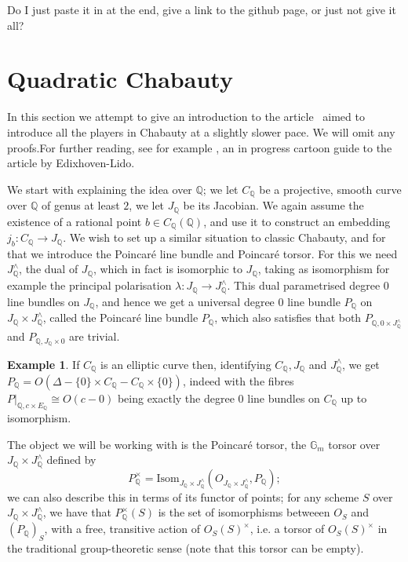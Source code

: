 \documentclass[12pt]{article}
\renewcommand{\G}{\mathbb{G}}
\newcommand{\Q}{\mathbb{Q}}
\theoremstyle{plain}
\theoremstyle{definition}
\newtheorem{exmp}[thm]{Example} %
\theoremstyle{remark}
\begin{document}
 Do I just paste it in at the end, give a link to the github page, or just not give it all?

\section{Quadratic Chabauty}
\label{section:quadratic}
In this section we attempt to give an introduction to the article~\citep{edixhoven20} aimed to introduce all the players in Chabauty at a slightly slower pace. We will omit any proofs.For further reading, see for example \citep{hashimoto20}, an in progress cartoon guide to the article by Edixhoven-Lido.

We start with explaining the idea over $\Q$; we let $C_\Q$ be a projective, smooth curve over $\Q$ of genus at least $2$, we let $J_\Q$ be its Jacobian. We again assume the existence of a rational point $b \in C_\Q(\Q)$, and use it to construct an embedding $j_b : C_\Q \to J_\Q$. We wish to set up a similar situation to classic Chabauty, and for that we introduce the Poincar\'e line bundle and Poincar\'e torsor. For this we need $J_\Q^\wedge$, the dual of $J_\Q$, which in fact is isomorphic to $J_\Q$, taking as isomorphism for example the principal polarisation $\lambda: J_\Q \to J_\Q^\wedge$. This dual parametrised degree $0$ line bundles on $J_\Q$, and hence we get a universal degree $0$ line bundle $P_\Q$ on $J_\Q \times J_\Q^\wedge$, called the Poincar\'e line bundle $P_\Q$, which also satisfies that both $P_{\Q,0\times J_\Q^\wedge}$ and $P_{\Q,J_\Q \times 0}$ are trivial.

\begin{exmp}
If $C_\Q$ is an elliptic curve then, identifying $C_\Q,J_\Q$ and $J_\Q^{\wedge}$, we get $P_\Q = O(\Delta-\{0\} \times C_\Q - C_\Q \times \{0\})$, indeed with the fibres $P|_{\Q,c \times E_\Q} \cong O(c-0)$ being exactly the degree $0$ line bundles on $C_\Q$ up to isomorphism.
\end{exmp}

The object we will be working with is the Poincar\'e torsor, the $\G_m$ torsor over $J_\Q \times J_\Q^\wedge$ defined by \[
P_\Q^\times = \text{Isom}_{J_\Q \times J^\wedge_\Q}(O_{J_\Q \times J^\wedge_\Q},P_\Q);
\] 
we can also describe this in terms of its functor of points; for any scheme $S$ over $J_\Q \times J^\wedge_\Q$, we have that $P^\times_\Q(S)$ is the set of isomorphisms betweeen $O_S$ and $(P_\Q)_S$, with a free, transitive action of $O_S(S)^\times$, i.e. a torsor of $O_S(S)^\times$ in the traditional group-theoretic sense (note that this torsor can be empty).
\end{document}
